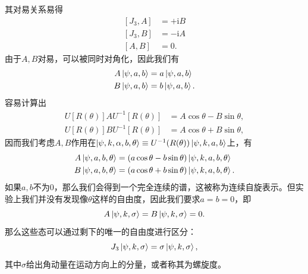 其对易关系易得
\begin{equation*}
	\begin{aligned}
		[ J_{3} ,A] & =+\mathrm{i} B\\
		[ J_{3} ,B] & =-\mathrm{i} A\\
		[ A,B] & =0.
	\end{aligned}
\end{equation*}
由于$ A,B$对易，可以被同时对角化，因此我们有
\begin{equation*}
	\begin{aligned}
		A\ket{\psi ,a,b} & =a\ket{\psi ,a,b}\\
		B\ket{\psi ,a,b} & =b\ket{\psi ,a,b} .
	\end{aligned}
\end{equation*}
容易计算出
\begin{equation*}
	\begin{aligned}
		U[ R( \theta )] AU^{-1}[ R( \theta )] & =A\cos \theta -B\sin \theta ,\\
		U[ R( \theta )] BU^{-1}[ R( \theta )] & =A\cos \theta + B\sin \theta ,
	\end{aligned}
\end{equation*}
因而我们考虑$ A,B$作用在$ \ket{\psi ,k,\alpha ,b,\theta } \equiv U^{-1}( R( \theta ))\ket{\psi ,k,a,b}$上，有
\begin{equation*}
	\begin{aligned}
		A\ket{\psi ,a,b,\theta } & =( a\cos \theta -b\sin \theta )\ket{\psi ,k,a,b,\theta }\\
		B\ket{\psi ,a,b,\theta } & =( a\cos \theta +b\sin \theta )\ket{\psi ,k,a,b,\theta } .
	\end{aligned}
\end{equation*}
如果$ a,b$不为0，那么我们会得到一个完全连续的谱，这被称为连续自旋表示。但实验上我们并没有发现像$ \theta $这样的自由度，因此我们要求$ a=b=0$，即
\begin{equation*}
	A\ket{\psi ,k,\sigma } =B\ket{\psi ,k,\sigma } =0.
\end{equation*}
那么这些态可以通过剩下的唯一的自由度进行区分：
\begin{equation*}
	J_{3}\ket{\psi ,k,\sigma } =\sigma \ket{\psi ,k,\sigma } ,
\end{equation*}
其中$ \sigma $给出角动量在运动方向上的分量，或者称其为螺旋度。


